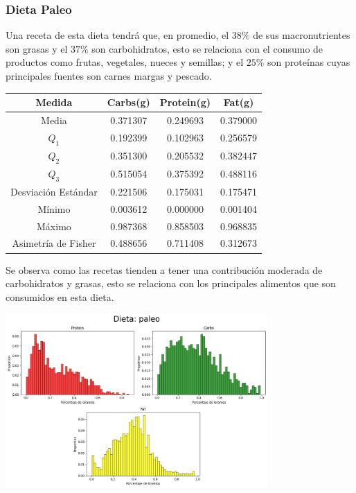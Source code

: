 \documentclass[12pt,a4paper]{article}
\begin{document}
    \subsubsection{Dieta Paleo}
        Una receta de esta dieta tendrá que, en promedio, el $38\%$ de sus 
        macronutrientes son grasas y el $37\%$ son carbohidratos, esto se 
        relaciona con el consumo de productos como frutas, vegetales, nueces 
        y semillas; y el $25\%$ son proteínas cuyas principales fuentes son 
        carnes margas y pescado.
        \begin{center}
            \begin{tabular}{|c|ccc|}
                \hline
                Medida & Carbs(g) & Protein(g) & Fat(g) \\
                \hline
                Media               & 0.371307 & 0.249693 & 0.379000  \\
                $Q_1$               & 0.192399 & 0.102963 & 0.256579  \\
                $Q_2$               & 0.351300 & 0.205532 & 0.382447  \\
                $Q_3$               & 0.515054 & 0.375392 & 0.488116  \\
                Desviación Estándar & 0.221506 & 0.175031 & 0.175471  \\
                Mínimo              & 0.003612 & 0.000000 & 0.001404  \\
                Máximo              & 0.987368 & 0.858503 & 0.968835  \\
                Asimetría de Fisher & 0.488656 & 0.711408 & 0.312673  \\
                \hline
            \end{tabular}
        \end{center}
        Se observa como las recetas tienden a tener una contribución moderada de 
        carbohidratos y grasas, esto se relaciona con los principales alimentos 
        que son consumidos en esta dieta.
        \begin{center}
            \includegraphics[width=0.75\textwidth]{Resources/2_03_plot_04.png}
        \end{center}
\end{document}
